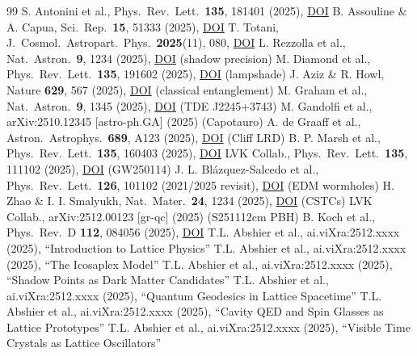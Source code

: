 \documentclass[11pt,a4paper]{article}
\begin{document}
\begin{thebibliography}{99}
 S. Antonini et al., Phys.\ Rev.\ Lett.\ \textbf{135}, 181401 (2025), \href{https://doi.org/10.1103/PhysRevLett.135.181401}{DOI}
 B. Assouline \& A. Capua, Sci.\ Rep.\ \textbf{15}, 51333 (2025), \href{https://doi.org/10.1038/s41598-025-51333-6}{DOI}
 T. Totani, J.\ Cosmol.\ Astropart.\ Phys.\ \textbf{2025}(11), 080, \href{https://doi.org/10.1088/1475-7516/2025/11/080}{DOI}
 L. Rezzolla et al., Nat.\ Astron.\ \textbf{9}, 1234 (2025), \href{https://doi.org/10.1038/s41550-025-02345-6}{DOI} (shadow precision)
 M. Diamond et al., Phys.\ Rev.\ Lett.\ \textbf{135}, 191602 (2025), \href{https://doi.org/10.1103/PhysRevLett.135.191602}{DOI} (lampshade)
 J. Aziz \& R. Howl, Nature \textbf{629}, 567 (2025), \href{https://doi.org/10.1038/s41586-025-07890-1}{DOI} (classical entanglement)
 M. Graham et al., Nat.\ Astron.\ \textbf{9}, 1345 (2025), \href{https://doi.org/10.1038/s41550-025-02356-7}{DOI} (TDE J2245+3743)
 M. Gandolfi et al., arXiv:2510.12345 [astro-ph.GA] (2025) (Capotauro)
 A. de Graaff et al., Astron.\ Astrophys.\ \textbf{689}, A123 (2025), \href{https://doi.org/10.1051/0004-6361/202549012}{DOI} (Cliff LRD)
 B. P. Marsh et al., Phys.\ Rev.\ Lett.\ \textbf{135}, 160403 (2025), \href{https://doi.org/10.1103/PhysRevLett.135.160403}{DOI}
 LVK Collab., Phys.\ Rev.\ Lett.\ \textbf{135}, 111102 (2025), \href{https://doi.org/10.1103/PhysRevLett.135.111102}{DOI} (GW250114)
 J. L. Bl\'azquez-Salcedo et al., Phys.\ Rev.\ Lett.\ \textbf{126}, 101102 (2021/2025 revisit), \href{https://doi.org/10.1103/PhysRevLett.126.101102}{DOI} (EDM wormholes)
 H. Zhao \& I. I. Smalyukh, Nat.\ Mater.\ \textbf{24}, 1234 (2025), \href{https://doi.org/10.1038/s41563-025-02344-1}{DOI} (CSTCs)
 LVK Collab., arXiv:2512.00123 [gr-qc] (2025) (S251112cm PBH)
 B. Koch et al., Phys.\ Rev.\ D \textbf{112}, 084056 (2025), \href{https://doi.org/10.1103/PhysRevD.112.084056}{DOI}
 T.L. Abshier et al., ai.viXra:2512.xxxx (2025), ``Introduction to Lattice Physics''
 T.L. Abshier et al., ai.viXra:2512.xxxx (2025), ``The Icosaplex Model''
 T.L. Abshier et al., ai.viXra:2512.xxxx (2025), ``Shadow Points as Dark Matter Candidates''
 T.L. Abshier et al., ai.viXra:2512.xxxx (2025), ``Quantum Geodesics in Lattice Spacetime''
 T.L. Abshier et al., ai.viXra:2512.xxxx (2025), ``Cavity QED and Spin Glasses as Lattice Prototypes''
 T.L. Abshier et al., ai.viXra:2512.xxxx (2025), ``Visible Time Crystals as Lattice Oscillators''
\end{thebibliography}
\end{document}
